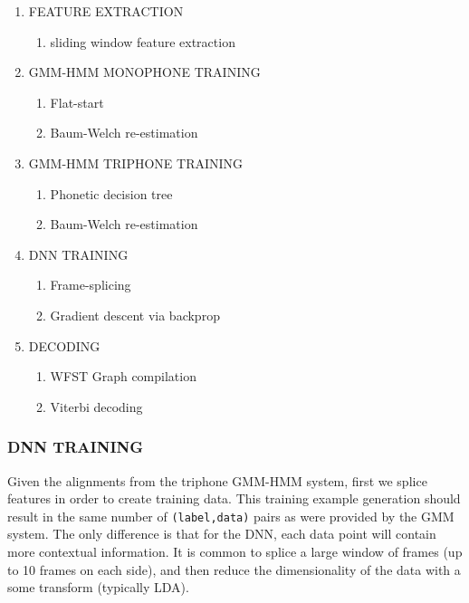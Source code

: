 \documentclass[10pt,a4paper]{article}
\begin{document}
\begin{enumerate}

\item FEATURE EXTRACTION
  \begin{enumerate}
  \item sliding window feature extraction
  \end{enumerate}
  

\item GMM-HMM MONOPHONE TRAINING
  \begin{enumerate}
  \item Flat-start
  \item Baum-Welch re-estimation
  \end{enumerate}
  
\item GMM-HMM TRIPHONE TRAINING  
  \begin{enumerate}
  \item Phonetic decision tree
  \item Baum-Welch re-estimation
  \end{enumerate}

  
\item DNN TRAINING
  \begin{enumerate}
  \item Frame-splicing
  \item Gradient descent via backprop
  \end{enumerate}
  
\item DECODING
  \begin{enumerate}
  \item WFST Graph compilation
  \item Viterbi decoding
  \end{enumerate}
  
\end{enumerate}


\subsubsection*{DNN TRAINING}

Given the alignments from the triphone GMM-HMM system, first we splice features in order to create training data. This training example generation should result in the same number of \texttt{(label,data)} pairs as were provided by the GMM system. The only difference is that for the DNN, each data point will contain more contextual information. It is common to splice a large window of frames (up to 10 frames on each side), and then reduce the dimensionality of the data with a some transform (typically LDA).
\end{document}
